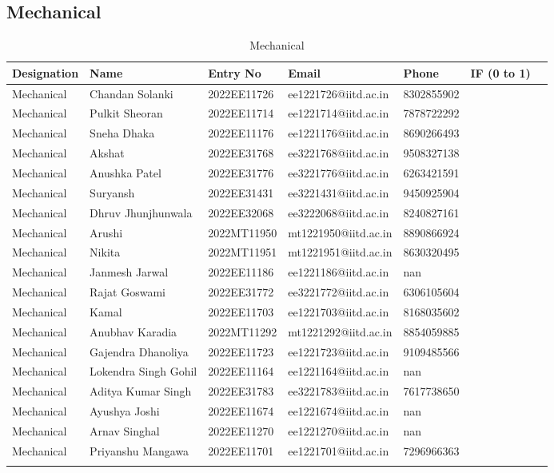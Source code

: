 \documentclass[a4paper,12pt]{article}
\begin{document}
\subsection{Mechanical}
\begin{longtable}[c]{|l|l|l|l|l|l|l|}
\hline
\textbf{Designation} & \textbf{Name} & \textbf{Entry No} & \textbf{Email} & \textbf{Phone} & \textbf{IF (0 to 1)} \\
\hline
Mechanical & Chandan Solanki & 2022EE11726 & ee1221726@iitd.ac.in & 8302855902 &  &  \\ \hline
Mechanical & Pulkit Sheoran & 2022EE11714 & ee1221714@iitd.ac.in & 7878722292 &  &  \\ \hline
Mechanical & Sneha Dhaka & 2022EE11176 & ee1221176@iitd.ac.in & 8690266493 &  &  \\ \hline
Mechanical & Akshat & 2022EE31768 & ee3221768@iitd.ac.in & 9508327138 &  &  \\ \hline
Mechanical & Anushka Patel & 2022EE31776 & ee3221776@iitd.ac.in & 6263421591 &  &  \\ \hline
Mechanical & Suryansh & 2022EE31431 & ee3221431@iitd.ac.in & 9450925904 &  &  \\ \hline
Mechanical & Dhruv Jhunjhunwala & 2022EE32068 & ee3222068@iitd.ac.in & 8240827161 &  &  \\ \hline
Mechanical & Arushi & 2022MT11950 & mt1221950@iitd.ac.in & 8890866924 &  &  \\ \hline
Mechanical & Nikita & 2022MT11951 & mt1221951@iitd.ac.in & 8630320495 &  &  \\ \hline
Mechanical & Janmesh Jarwal & 2022EE11186 & ee1221186@iitd.ac.in & nan &  &  \\ \hline
Mechanical & Rajat Goswami & 2022EE31772 & ee3221772@iitd.ac.in & 6306105604 &  &  \\ \hline
Mechanical & Kamal & 2022EE11703 & ee1221703@iitd.ac.in & 8168035602 &  &  \\ \hline
Mechanical & Anubhav Karadia & 2022MT11292 & mt1221292@iitd.ac.in & 8854059885 &  &  \\ \hline
Mechanical & Gajendra Dhanoliya & 2022EE11723 & ee1221723@iitd.ac.in & 9109485566 &  &  \\ \hline
Mechanical & Lokendra Singh Gohil & 2022EE11164 & ee1221164@iitd.ac.in & nan &  &  \\ \hline
Mechanical & Aditya Kumar Singh & 2022EE31783 & ee3221783@iitd.ac.in & 7617738650 &  &  \\ \hline
Mechanical & Ayushya Joshi & 2022EE11674 & ee1221674@iitd.ac.in & nan &  &  \\ \hline
Mechanical & Arnav Singhal & 2022EE11270 & ee1221270@iitd.ac.in & nan &  &  \\ \hline
Mechanical & Priyanshu Mangawa & 2022EE11701 & ee1221701@iitd.ac.in & 7296966363 &  &  \\ \hline
\caption{Mechanical}
\end{longtable}
\end{document}
